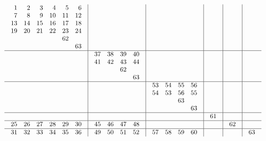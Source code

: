 \documentclass[12pt,a4paper]{amsart}
\begin{document}
\begin{align*}
  \begin{array}{c|c|c|c|c|c}
\begin{array}{rrrrrr}%
1&2&3&4&5&6\\%
7&8&9&10&11&12\\%
13&14&15&16&17&18\\%
19&20&21&22&23&24\\%
  &  &  &  &62&  \\%
  &  &  &  &  &63\\%
\end{array}%
&&&&& \\\hline
&
\begin{array}{rrrr}%
37&38&39&40\\%
41&42&43&44\\%
  &  &62&  \\%
  &  &  &63\\%
\end{array}%
&&&& \\\hline
&&
\begin{array}{rrrr}%
53&54&55&56\\%
54&53&56&55\\%
  &  &63&  \\%
  &  &  &63\\%
\end{array}%
&&& \\\hline
&&&
\begin{array}{r}%
61\\%
\end{array}%
&& \\\hline
\begin{array}{rrrrrr}%
25&26&27&28&29&30\\%
\end{array}%
&
\begin{array}{rrrr}%
45&46&47&48\\%
\end{array}%
&&&
\begin{array}{r}%
62\\%
\end{array}%
& \\\hline
\begin{array}{rrrrrr}%
31&32&33&34&35&36\\%
\end{array}%
&
\begin{array}{rrrr}%
49&50&51&52\\%
\end{array}%
&
\begin{array}{rrrr}%
{57}&{58}&{59}&{60}\\%
\end{array}%
&&&
\begin{array}{r}%
63\\%
\end{array}%
\end{array}
\end{align*}
\end{document}
